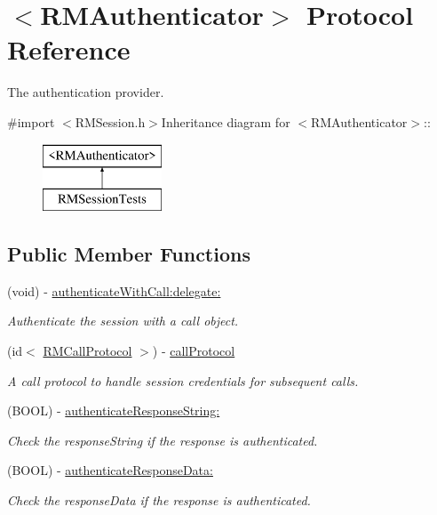 \hypertarget{protocol_r_m_authenticator-p}{
\section{$<$RMAuthenticator$>$ Protocol Reference}
\label{protocol_r_m_authenticator-p}
}


The authentication provider.  


{\ttfamily \#import $<$RMSession.h$>$}Inheritance diagram for $<$RMAuthenticator$>$::\begin{figure}[H]
\begin{center}
\leavevmode
\includegraphics[height=2cm]{protocol_r_m_authenticator-p}
\end{center}
\end{figure}
\subsection*{Public Member Functions}
\begin{DoxyCompactItemize}
\item 
(void) -\/ \hyperlink{protocol_r_m_authenticator-p_a89800622f7067e082cbb6665f51d44c8}{authenticateWithCall:delegate:}
\begin{DoxyCompactList}\small\item\em Authenticate the session with a call object. \item\end{DoxyCompactList}\item 
(id$<$ \hyperlink{protocol_r_m_call_protocol-p}{RMCallProtocol} $>$) -\/ \hyperlink{protocol_r_m_authenticator-p_a1a8ee1ab6eb4014dd3783e096173f000}{callProtocol}
\begin{DoxyCompactList}\small\item\em A call protocol to handle session credentials for subsequent calls. \item\end{DoxyCompactList}\item 
(BOOL) -\/ \hyperlink{protocol_r_m_authenticator-p_adf5dc80e89981e86b61d1720ad441c79}{authenticateResponseString:}
\begin{DoxyCompactList}\small\item\em Check the responseString if the response is authenticated. \item\end{DoxyCompactList}\item 
(BOOL) -\/ \hyperlink{protocol_r_m_authenticator-p_aa82480a76b720c6497425661de692eea}{authenticateResponseData:}
\begin{DoxyCompactList}\small\item\em Check the responseData if the response is authenticated. \item\end{DoxyCompactList}\end{DoxyCompactItemize}


